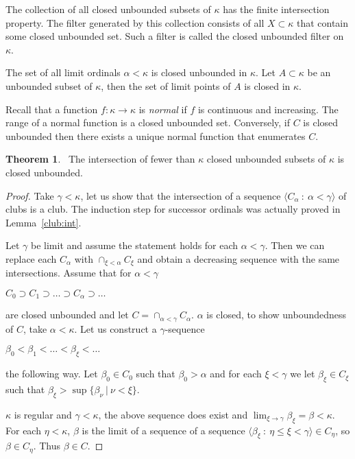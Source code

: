 \documentclass[8pt]{article}
\theoremstyle{definition}
\theoremstyle{definition}
\newtheorem{theorem}{Theorem}[section]
\theoremstyle{definition}
\theoremstyle{definition}
\theoremstyle{definition}
\theoremstyle{definition}
\theoremstyle{definition}
\theoremstyle{definition}
\theoremstyle{definition}
\theoremstyle{definition}
\theoremstyle{definition}
\theoremstyle{definition}
\theoremstyle{definition}
\theoremstyle{definition}
\theoremstyle{question}
\begin{document}
The collection of all closed unbounded subsets of $\kappa$ has the finite intersection property.
The filter generated by this collection consists of all $X \subset \kappa$ that contain some closed unbounded set.
Such a filter is called the closed unbounded filter on $\kappa$.

The set of all limit ordinals $\alpha < \kappa$ is closed unbounded in $\kappa$. 
Let $A \subset \kappa$ be an unbounded subset of $\kappa$, then the set of limit points of $A$ is closed in $\kappa$.

Recall that a function $f : \kappa \to \kappa$ is \emph{normal} if $f$ is continuous and increasing.
The range of a normal function is a closed unbounded set. Conversely, if $C$ is closed unbounded
then there exists a unique normal function that enumerates $C$.

\begin{theorem}~\label{closed:unbonded:theorem}
The intersection of fewer than $\kappa$ closed unbounded subsets of $\kappa$ is closed unbounded.
\end{theorem}

\begin{proof}
  Take $\gamma < \kappa$, let us show that the intersection of a sequence 
  $\langle C_{\alpha} \: : \: \alpha < \gamma \rangle$ of clubs is a club.
  The induction step for successor ordinals was actually proved in Lemma~\ref{club:int}.

  Let $\gamma$ be limit and assume the statement holds for each $\alpha < \gamma$.
  Then we can replace each $C_{\alpha}$ with $\cap_{\xi < \alpha} C_{\xi}$ and obtain a decreasing sequence with the same
  intersections. Assume that for $\alpha < \gamma$
  \begin{center}
    $C_0 \supset C_1 \supset \ldots \supset C_{\alpha} \supset \dots $
  \end{center}
  are closed unbounded and let $C = \cap_{\alpha < \gamma} C_{\alpha}$.
  $\alpha$ is closed, to show unboundedness of $C$, take $\alpha < \kappa$. Let us construct a $\gamma$-sequence
  \begin{center}
    $\beta_0 < \beta_1 < \ldots < \beta_{\xi} < \ldots$
  \end{center}
  the following way. Let $\beta_0 \in C_0$ such that $\beta_0 > \alpha$ and for each 
  $\xi < \gamma$ we let $\beta_{\xi} \in C_{\xi}$ such that $\beta_{\xi} > \sup \{ \beta_{\nu} \: | \: \nu < \xi \}$.

  $\kappa$ is regular and $\gamma < \kappa$, the above sequence does exist and 
  $\lim_{\xi \to \gamma} \beta_{\xi} = \beta < \kappa$. For each $\eta < \kappa$, $\beta$ is the limit 
  of a sequence of a sequence $\langle \beta_{\xi} \: : \: \eta \leq \xi < \gamma \rangle \in C_{\eta}$, so $\beta \in C_{\eta}$.
  Thus $\beta \in C$.
\end{proof} 
\end{document}

